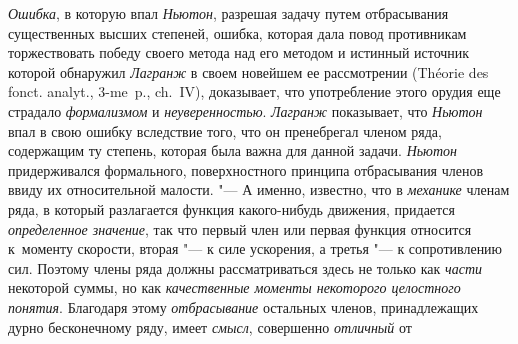 {\em Ошибка}, в которую впал {\em Ньютон}, разрешая задачу путем отбрасывания
существенных высших степеней, ошибка, которая дала повод противникам
торжествовать победу своего метода над его методом и истинный источник которой
обнаружил {\em Лагранж} в своем новейшем ее рассмотрении (Théorie des fonct.
analyt., 3-me~p., ch.~IV), доказывает, что употребление этого орудия еще
страдало {\em формализмом} и {\em неуверенностью}. {\em Лагранж} показывает,
что {\em Ньютон} впал в свою ошибку вследствие того, что он пренебрегал членом
ряда, содержащим ту степень, которая была важна для данной задачи. {\em Ньютон}
придерживался формального, поверхностного принципа отбрасывания членов ввиду их
относительной малости. "--- А именно, известно, что в {\em механике} членам
ряда, в который разлагается функция какого-нибудь движения, придается
{\em определенное значение}, так что первый член или первая функция относится
к~моменту скорости, вторая "--- к силе ускорения, а третья "--- к сопротивлению
сил. Поэтому члены ряда должны рассматриваться здесь не только как {\em части}
некоторой суммы, но как {\em качественные моменты некоторого целостного
понятия}. Благодаря этому {\em отбрасывание} остальных членов, принадлежащих
дурно бесконечному ряду, имеет {\em смысл}, совершенно {\em отличный} от

